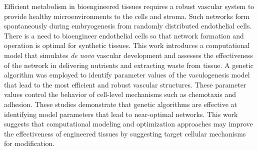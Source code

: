 Efficient metabolism in bioengineered tissues requires a robust vascular system to provide healthy microenvironments to the cells and stroma. Such networks form spontaneously during embryogenesis from randomly distributed endothelial cells. There is a need to bioengineer endothelial cells so that network formation and operation is optimal for synthetic tissues. This work introduces a computational model that simulates \textit{de novo} vascular development and assesses the effectiveness of the network in delivering nutrients and extracting waste from tissue. A genetic algorithm was employed to identify parameter values of the vaculogenesis model that lead to the most efficient and robust vascular structures. These parameter values control the behavior of cell-level mechanisms such as chemotaxis and adhesion. These studies demonstrate that genetic algorithms are effective at identifying model parameters that lead to near-optimal networks. This work suggests that computational modeling and optimization approaches may improve the effectiveness of engineered tissues by suggesting target cellular mechanisms for modification. 
